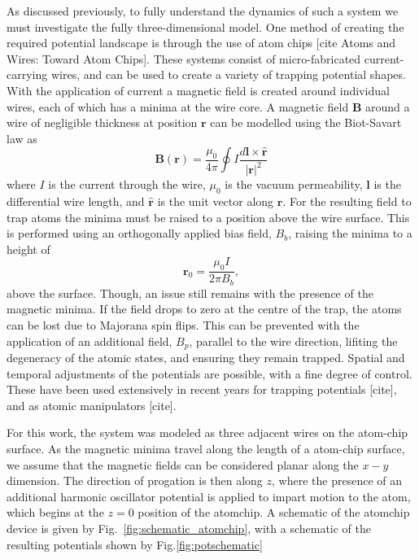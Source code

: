 As discussed previously, to fully understand the dynamics of such a system we must investigate the fully three-dimensional model. One method of creating the required potential landscape is through the use of atom chips \cite{Bartenstein_ieee_2000}[cite Atoms and Wires: Toward Atom Chips]. These systems consist of micro-fabricated current-carrying wires, and can be used to create a variety of trapping potential shapes. With the application of current a magnetic field is created around individual wires, each of which has a minima at the wire core. A magnetic field $\mathbf{B}$ around a wire of negligible thickness at position $\mathbf{r}$ can be modelled using the Biot-Savart law as
\begin{equation}
    \mathbf{B}(\mathbf{r}) = \frac{\mu_0}{4\pi}\oint I \frac{d\mathbf{l}\times \hat{\mathbf{r}}}{|\mathbf{r}|^2}
\end{equation}
where $I$ is the current through the wire, $\mu_0$ is the vacuum permeability, $\mathbf{l}$ is the differential wire length, and $\hat{\mathbf{r}}$ is the unit vector along $\mathbf{r}$. For the resulting field to trap atoms the minima must be raised to a position above the wire surface. This is performed using an orthogonally applied bias field, ${B}_b$, raising the minima to a height of
\begin{equation}
    \mathbf{r}_0 = \frac{\mu_0 I}{2\pi {B}_b},
\end{equation}
above the surface. Though, an issue still remains with the presence of the magnetic minima. If the field drops to zero at the centre of the trap, the atoms can be lost due to Majorana spin flips. This can be prevented with the application of an additional field, ${B}_{p}$, parallel to the wire direction, lifiting the degeneracy of the atomic states, and ensuring they remain trapped. Spatial and temporal adjustments of the potentials are possible, with a fine degree of control. These have been used extensively in recent years for trapping potentials [cite], and as atomic manipulators [cite].

For this work, the system was modeled as three adjacent wires on the atom-chip surface. As the magnetic minima travel along the length of a atom-chip surface, we assume that the magnetic fields can be considered planar along the $x-y$ dimension. The direction of progation is then along $z$, where the presence of an additional harmonic oscillator potential is applied to impart motion to the atom, which begins at the $z=0$ position of the atomchip. A schematic of the atomchip device is given by Fig.~\ref{fig:schematic_atomchip}, with a schematic of the resulting potentials shown by Fig.\ref{fig:potschematic}


